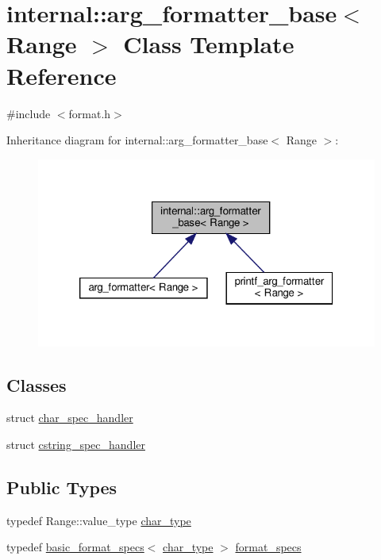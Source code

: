 \hypertarget{classinternal_1_1arg__formatter__base}{}\section{internal\+:\+:arg\+\_\+formatter\+\_\+base$<$ Range $>$ Class Template Reference}
\label{classinternal_1_1arg__formatter__base}


{\ttfamily \#include $<$format.\+h$>$}



Inheritance diagram for internal\+:\+:arg\+\_\+formatter\+\_\+base$<$ Range $>$\+:
\nopagebreak
\begin{figure}[H]
\begin{center}
\leavevmode
\includegraphics[width=320pt]{classinternal_1_1arg__formatter__base__inherit__graph}
\end{center}
\end{figure}
\subsection*{Classes}
\begin{DoxyCompactItemize}
\item 
struct \hyperlink{structinternal_1_1arg__formatter__base_1_1char__spec__handler}{char\+\_\+spec\+\_\+handler}
\item 
struct \hyperlink{structinternal_1_1arg__formatter__base_1_1cstring__spec__handler}{cstring\+\_\+spec\+\_\+handler}
\end{DoxyCompactItemize}
\subsection*{Public Types}
\begin{DoxyCompactItemize}
\item 
typedef Range\+::value\+\_\+type \hyperlink{classinternal_1_1arg__formatter__base_a407930bf282880d2ca45dfa8f5d2034b}{char\+\_\+type}
\item 
typedef \hyperlink{structbasic__format__specs}{basic\+\_\+format\+\_\+specs}$<$ \hyperlink{classinternal_1_1arg__formatter__base_a407930bf282880d2ca45dfa8f5d2034b}{char\+\_\+type} $>$ \hyperlink{classinternal_1_1arg__formatter__base_acff46f7da1afa536210eb77a2ea0d775}{format\+\_\+specs}
\end{DoxyCompactItemize}
